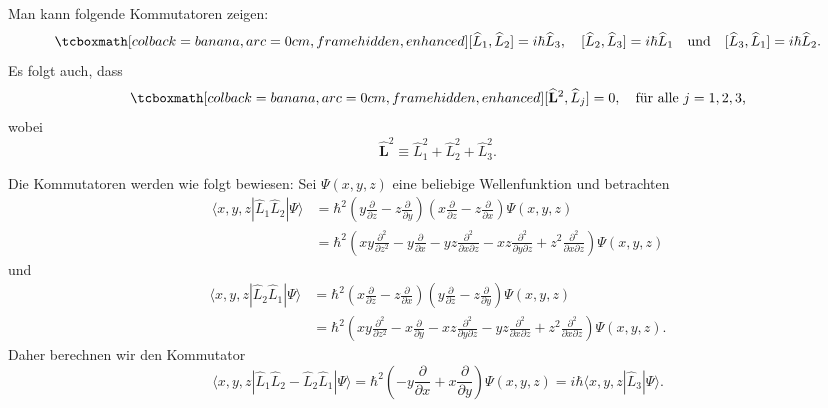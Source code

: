 Man kann folgende Kommutatoren zeigen:
\begin{equation}
	\eqbox{[\widehat{L}_1,\widehat{L}_2] = i\hbar \widehat{L}_3, \quad [\widehat{L}_2,\widehat{L}_3] = i\hbar \widehat{L}_1\quad\text{und}\quad [\widehat{L}_3,\widehat{L}_1] = i\hbar \widehat{L}_2.}
\end{equation}
Es folgt auch, dass
\begin{equation}
	\eqbox{[\widehat{\mathbf{L}}^2, \widehat{L}_j]=0, \quad \text{für alle $j=1,2,3$,}}
\end{equation}
wobei
\begin{equation}
	\widehat{\mathbf{L}}^2 \equiv \widehat{L}_1^2+\widehat{L}_2^2+\widehat{L}_3^2.
\end{equation}

Die Kommutatoren werden wie folgt bewiesen: Sei $\Psi(x,y,z)$ eine beliebige Wellenfunktion und betrachten
\begin{equation}
	\begin{split}
		\langle x,y,z|\widehat{L}_1\widehat{L}_2|\Psi\rangle &= {\hbar}^2 \left(y\frac{\partial}{\partial z} - z\frac{\partial}{\partial y} \right)\left(x\frac{\partial}{\partial z} - z\frac{\partial}{\partial x} \right)\Psi(x,y,z) \\
		&= {\hbar}^2 \left(xy\frac{\partial^2}{\partial z^2} - y\frac{\partial}{\partial x} - yz\frac{\partial^2}{\partial x \partial z} - xz\frac{\partial^2}{\partial y\partial z}  + z^2\frac{\partial^2}{\partial x\partial z} \right)\Psi(x,y,z)
	\end{split}
\end{equation}
und 
\begin{equation}
	\begin{split}
		\langle x,y,z|\widehat{L}_2\widehat{L}_1|\Psi\rangle &= {\hbar}^2 \left(x\frac{\partial}{\partial z} - z\frac{\partial}{\partial x} \right)\left(y\frac{\partial}{\partial z} - z\frac{\partial}{\partial y} \right)\Psi(x,y,z) \\
		&= {\hbar}^2 \left(xy\frac{\partial^2}{\partial z^2} - x\frac{\partial}{\partial y} - xz\frac{\partial^2}{\partial y \partial z} - yz\frac{\partial^2}{\partial x\partial z}  + z^2\frac{\partial^2}{\partial x\partial z} \right)\Psi(x,y,z).
	\end{split}
\end{equation}
Daher berechnen wir den Kommutator
\begin{equation}
	\langle x,y,z|\widehat{L}_1\widehat{L}_2 - \widehat{L}_2\widehat{L}_1|\Psi\rangle = {\hbar}^2 \left(- y\frac{\partial}{\partial x} + x\frac{\partial}{\partial y} \right)\Psi(x,y,z) = i\hbar \langle x,y,z|\widehat{L}_3|\Psi\rangle.
\end{equation}

